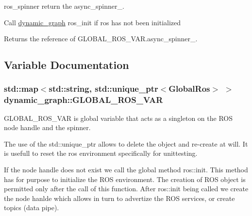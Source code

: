 ros\+\_\+spinner return the async\+\_\+spinner\+\_\+. 

Call \hyperlink{namespacedynamic__graph}{dynamic\+\_\+graph} ros\+\_\+init if ros has not been initialized \begin{DoxyReturn}{Returns}
the reference of G\+L\+O\+B\+A\+L\+\_\+\+R\+O\+S\+\_\+\+V\+A\+R.\+async\+\_\+spinner\+\_\+. 
\end{DoxyReturn}


\subsection{Variable Documentation}
\subsubsection[{\texorpdfstring{G\+L\+O\+B\+A\+L\+\_\+\+R\+O\+S\+\_\+\+V\+AR}{GLOBAL_ROS_VAR}}]{\setlength{\rightskip}{0pt plus 5cm}std\+::map$<$std\+::string, std\+::unique\+\_\+ptr$<${\bf Global\+Ros}$>$ $>$ dynamic\+\_\+graph\+::\+G\+L\+O\+B\+A\+L\+\_\+\+R\+O\+S\+\_\+\+V\+AR\hspace{0.3cm}{\ttfamily [static]}}\hypertarget{namespacedynamic__graph_a877a1ed0d2adf7f675abf17f70b936a6}{}\label{namespacedynamic__graph_a877a1ed0d2adf7f675abf17f70b936a6}


G\+L\+O\+B\+A\+L\+\_\+\+R\+O\+S\+\_\+\+V\+AR is global variable that acts as a singleton on the R\+OS node handle and the spinner. 

The use of the std\+::unique\+\_\+ptr allows to delete the object and re-\/create at will. It is usefull to reset the ros environment specifically for unittesting.

If the node handle does not exist we call the global method ros\+::init. This method has for purpose to initialize the R\+OS environment. The creation of R\+OS object is permitted only after the call of this function. After ros\+::init being called we create the node hanlde which allows in turn to advertize the R\+OS services, or create topics (data pipe). 